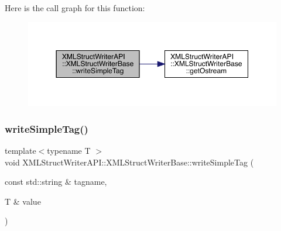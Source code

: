 Here is the call graph for this function\+:
\nopagebreak
\begin{figure}[H]
\begin{center}
\leavevmode
\includegraphics[width=350pt]{db/d4f/classXMLStructWriterAPI_1_1XMLStructWriterBase_a049c80e79c8f64d2b6b0221c01392d37_cgraph}
\end{center}
\end{figure}
\mbox{\label{classXMLStructWriterAPI_1_1XMLStructWriterBase_a049c80e79c8f64d2b6b0221c01392d37}} 
\subsubsection{\texorpdfstring{writeSimpleTag()}{writeSimpleTag()}\hspace{0.1cm}{\footnotesize\ttfamily [2/2]}}
{\footnotesize\ttfamily template$<$typename T $>$ \\
void X\+M\+L\+Struct\+Writer\+A\+P\+I\+::\+X\+M\+L\+Struct\+Writer\+Base\+::write\+Simple\+Tag (\begin{DoxyParamCaption}\item[{const std\+::string \&}]{tagname,  }\item[{T \&}]{value }\end{DoxyParamCaption})\hspace{0.3cm}{\ttfamily [inline]}}


